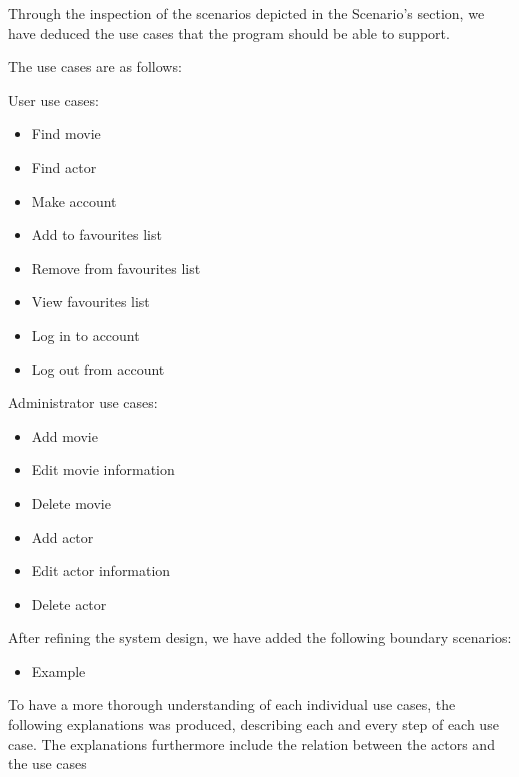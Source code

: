 Through the inspection of the scenarios depicted in the Scenario’s section, we have deduced the use cases that the program should be able to support.

The use cases are as follows:

User use cases:
\begin{itemize}
	\setlength{\itemsep}{-5pt}
	\item Find movie
	\item Find actor
	\item Make account
	\item Add to favourites list
	\item Remove from favourites list
	\item View favourites list
	\item Log in to account
	\item Log out from account
\end{itemize}

Administrator use cases:
\begin{itemize}
	\item Add movie
	\item Edit movie information
	\item Delete movie
	\item Add actor
	\item Edit actor information
	\item Delete actor
\end{itemize}

After refining the system design, we have added the following boundary scenarios:
\begin{itemize}
	\setlength{\itemsep}{-5pt}
	
	\item Example
\end{itemize}

To have a more thorough understanding of each individual use cases, the following explanations was produced, describing each and every step of each use case.
The explanations furthermore include the relation between the actors and the use cases

